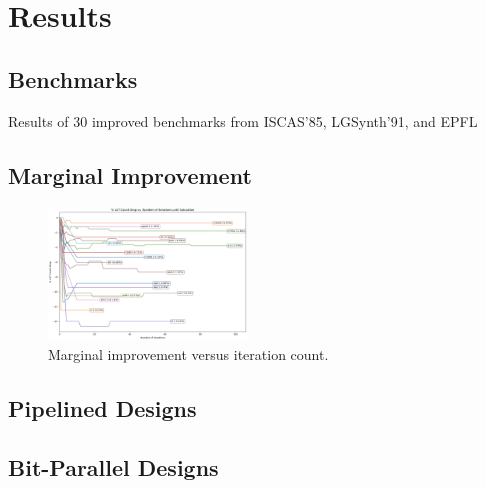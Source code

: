 \section{Results}\label{sec:results}

\subsection{Benchmarks}\label{sec:results:benchmark}
\begin{table}
    \centering
    \caption{Results of 30 improved benchmarks from ISCAS'85, LGSynth'91, and EPFL}\label{tab:results}
\end{table}
\subsection{Marginal Improvement}\label{sec:results:margin}
\begin{figure}
    \centering
    \includegraphics[width=0.47\textwidth]{img/improvement.png}
    \caption{Marginal improvement versus iteration count.}\label{fig:improvement}
    \Description[]{}
\end{figure}

\subsection{Pipelined Designs}\label{sec:results:retiming}

\subsection{Bit-Parallel Designs}\label{sec:results:scalability}

